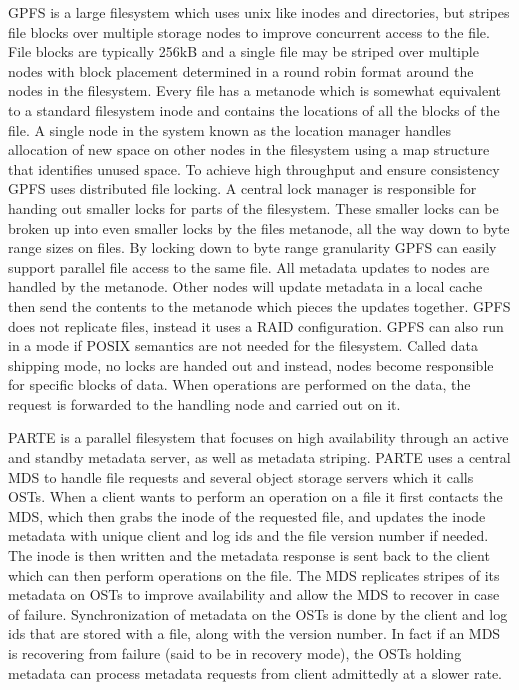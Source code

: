 GPFS \cite{Schmuck2002} is a large filesystem which uses unix like inodes and
directories, but stripes file blocks over multiple storage nodes to improve
concurrent access to the file. File blocks are typically 256kB and a single
file may be striped over multiple nodes with block placement determined in a
round robin format around the nodes in the filesystem. Every file has a
metanode which is somewhat equivalent to a standard filesystem inode and
contains the locations of all the blocks of the file. A single node in the
system known as the location manager handles allocation of new space on other
nodes in the filesystem using a map structure that identifies unused space. To
achieve high throughput and ensure consistency GPFS uses distributed file
locking. A central lock manager is responsible for handing out smaller locks
for parts of the filesystem. These smaller locks can be broken up into even
smaller locks by the files metanode, all the way down to byte range sizes on
files. By locking down to byte range granularity GPFS can easily support
parallel file access to the same file. All metadata updates to nodes are
handled by the metanode. Other nodes will update metadata in a local cache
then send the contents to the metanode which pieces the updates together. GPFS
does not replicate files, instead it uses a RAID configuration. GPFS can also
run in a mode if POSIX semantics are not needed for the filesystem. Called
data shipping mode, no locks are handed out and instead, nodes become
responsible for specific blocks of data. When operations are performed on the
data, the request is forwarded to the handling node and carried out on it.


PARTE  \cite{Liao2012} is a parallel filesystem that focuses on high
availability through an active and standby metadata server, as well as
metadata striping. PARTE uses a central MDS to handle file requests and
several object storage servers which it calls OSTs. When a client wants to
perform an operation on a file it first contacts the MDS, which then grabs the
inode of the requested file, and updates the inode metadata with unique client
and log ids and the file version number if needed. The inode is then written
and the metadata response is sent back to the client which can then perform
operations on the file. The MDS replicates stripes of its metadata on OSTs to
improve availability and allow the MDS to recover in case of failure.
Synchronization of metadata on the OSTs is done by the client and log ids that
are stored with a file, along with the version number. In fact if an MDS is
recovering from failure (said to be in recovery mode), the OSTs holding
metadata can process metadata requests from client admittedly at a slower
rate.


